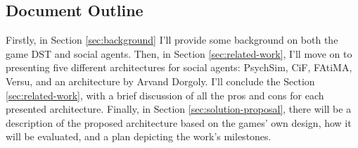 \subsection{Document Outline}
Firstly, in Section \ref{sec:background} I'll provide some background on both the game \ac{DST} and social agents.
Then, in Section \ref{sec:related-work}, I'll move on to presenting five different architectures for social agents: PsychSim, \ac{CiF}, FAtiMA, Versu, and an architecture by Arvand Dorgoly.
I'll conclude the Section \ref{sec:related-work}, with a brief discussion of all the pros and cons for each presented architecture.
Finally, in Section \ref{sec:solution-proposal}, there will be a description of the proposed architecture based on the games' own design, how it will be evaluated, and a plan depicting the work's milestones. 